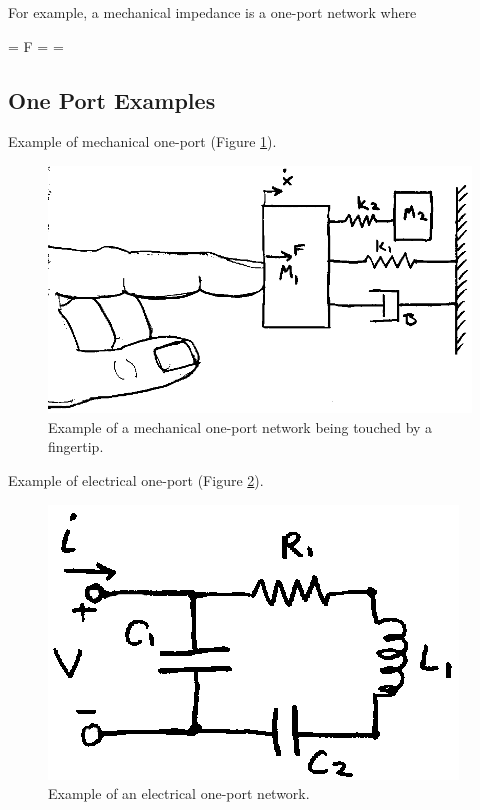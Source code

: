 For example, a mechanical impedance is a one-port network where

\bq
\ef = F  \qquad {} \qquad \fl =  = 
\eq


\subsection{One Port Examples}

Example of mechanical one-port (Figure \ref{MechanicalOnePort}).	%


\begin{figure}[p]	%
\centering \includegraphics{figs14/00303.eps}
\caption{Example of a mechanical one-port network being touched by a fingertip.}\label{MechanicalOnePort}	%
\end{figure}	%



\noindent Example of electrical  one-port (Figure \ref{ElectricalOnePort}).	%


\begin{figure}[p]	%
\centering \includegraphics{figs14/00304.eps}
\caption{Example of an electrical one-port network.}\label{ElectricalOnePort}	%
\end{figure}	%


